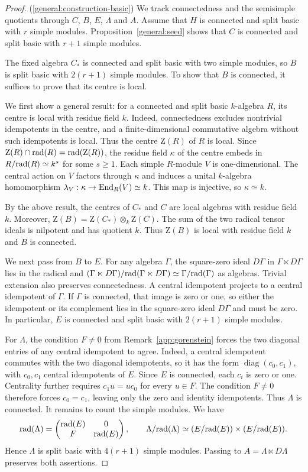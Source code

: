 \documentclass[11pt]{article}
\begin{document}
\begin{proof}
\textup{(\ref{general:construction-basic})} We track connectedness and the semisimple quotients
through $C$, $B$, $E$, $\Lambda$ and $A$.
Assume that $H$ is connected and split basic with $r$ simple modules.
Proposition~\ref{general:seed} shows that $C$ is connected
and split basic with $r+1$ simple modules.

The fixed algebra $C_*$ is connected and split basic with two simple
modules, so $B$ is split basic with $2(r+1)$ simple modules.
To show that $B$ is connected, it suffices to prove that its centre
is local.

We first show a general result: for a connected and split basic $k$-algebra $R$, its centre is local with residue field $k$. Indeed, connectedness excludes nontrivial idempotents in the centre, and a finite-dimensional commutative algebra without such idempotents is local. Thus the centre $\mathrm Z(R)$ of $R$ is local. Since $\mathrm Z(R)\cap{\rm rad}(R)={\rm rad}(\mathrm Z(R))$, the residue field $\kappa$ of the centre embeds in $R/{\rm rad}(R)\simeq k^s$ for some $s\geq 1$. Each simple $R$-module $V$ is one-dimensional. The central action on $V$ factors through $\kappa$ and induces a unital $k$-algebra homomorphism $\lambda_V:\kappa\to{\rm End}_R(V)\simeq k$. This map is injective, so $\kappa\simeq k$.

By the above result, the centres of $C_*$ and $C$ are local algebras with residue field $k$. Moreover,
$\mathrm Z(B)=\mathrm Z(C_*)\otimes_k\mathrm Z(C)$.
The sum of the two radical tensor ideals is nilpotent and has
quotient $k$. Thus $\mathrm Z(B)$ is local with residue field $k$ and $B$ is connected.


We next pass from $B$ to $E$. For any algebra $\Gamma$, the square-zero
ideal $D\Gamma$ in $\Gamma\ltimes D\Gamma$ lies in the radical and
$(\Gamma\ltimes D\Gamma)/{\rm rad}(\Gamma\ltimes D\Gamma)\simeq \Gamma/{\rm rad}(\Gamma)$ as algebras.
Trivial extension also preserves connectedness. A central idempotent projects to a central idempotent of $\Gamma$. If $\Gamma$ is connected, that image is zero or one, so either the idempotent or
its complement lies in the square-zero ideal $D\Gamma$ and must be zero.
In particular, $E$ is connected and split basic with $2(r+1)$ simple modules.

For $\Lambda$, the condition $F\ne0$ from Remark~\ref{app:gorenstein} forces the two diagonal entries of any central idempotent to agree. Indeed, a central idempotent commutes with the two diagonal idempotents, so it has the form $\operatorname{diag}(c_0,c_1)$, with $c_0,c_1$ central idempotents of $E$. Since $E$ is connected, each $c_i$ is zero or one. Centrality further requires $c_1u=uc_0$ for every $u\in F$.
The condition $F\ne0$ therefore forces $c_0=c_1$, leaving only
the zero and identity idempotents. Thus $\Lambda$ is connected.
It remains to count the simple modules. We have
\[
 {\rm rad}(\Lambda)=\begin{pmatrix}{\rm rad}(E)&0\\F&{\rm rad}(E)\end{pmatrix},\qquad
 \Lambda/{\rm rad}(\Lambda)\simeq(E/{\rm rad}(E))\times(E/{\rm rad}(E)).
\]
Hence $\Lambda$ is split basic with $4(r+1)$ simple modules.  Passing to
$A=\Lambda\ltimes D\Lambda$ preserves both assertions.
\end{proof}
\end{document}
